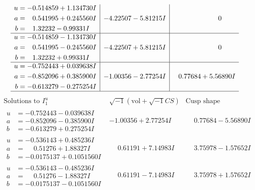 \documentclass[1p]{elsarticle_modified}
\theoremstyle{definition}
\newcommand{\I}{\sqrt{-1}}
\begin{document}
$$\begin{array}{c|c|c}
\begin{aligned}
u &= -0.514859 + 1.134730 I \\
a &= \phantom{-}0.541995 + 0.245560 I \\
b &= \phantom{-}1.32232 - 0.99331 I\end{aligned}
 & -4.22507 - 5.81215 I & \phantom{-0.000000 } 0 \\ \hline\begin{aligned}
u &= -0.514859 - 1.134730 I \\
a &= \phantom{-}0.541995 - 0.245560 I \\
b &= \phantom{-}1.32232 + 0.99331 I\end{aligned}
 & -4.22507 + 5.81215 I & \phantom{-0.000000 } 0 \\ \hline\begin{aligned}
u &= -0.752443 + 0.039638 I \\
a &= -0.852096 + 0.385900 I \\
b &= -0.613279 - 0.275254 I\end{aligned}
 & -1.00356 - 2.77254 I & \phantom{-}0.77684 + 5.56890 I\\
 \hline 
 \end{array}$$\newpage$$\begin{array}{c|c|c}  
\text{Solutions to }I^u_{1}& \I (\text{vol} + \sqrt{-1}CS) & \text{Cusp shape}\\
 \hline 
\begin{aligned}
u &= -0.752443 - 0.039638 I \\
a &= -0.852096 - 0.385900 I \\
b &= -0.613279 + 0.275254 I\end{aligned}
 & -1.00356 + 2.77254 I & \phantom{-}0.77684 - 5.56890 I \\ \hline\begin{aligned}
u &= -0.536143 + 0.485236 I \\
a &= \phantom{-}0.51276 + 1.88327 I \\
b &= -0.0175137 + 0.1051560 I\end{aligned}
 & \phantom{-}0.61191 + 7.14983 I & \phantom{-}3.75978 - 1.57652 I \\ \hline\begin{aligned}
u &= -0.536143 - 0.485236 I \\
a &= \phantom{-}0.51276 - 1.88327 I \\
b &= -0.0175137 - 0.1051560 I\end{aligned}
 & \phantom{-}0.61191 - 7.14983 I & \phantom{-}3.75978 + 1.57652 I \\ \hline\begin{aligned}

\end{aligned}
\end{array}$$
\end{document}

